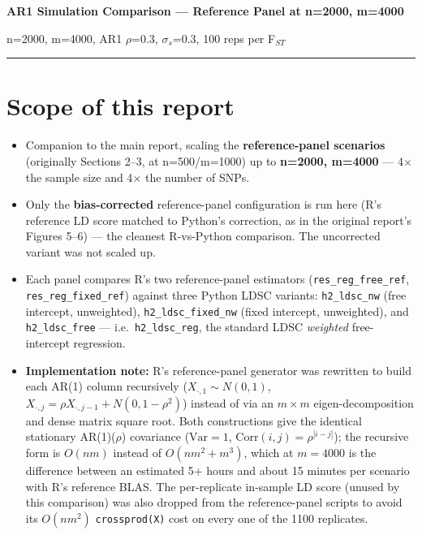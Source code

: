 \documentclass[10pt]{article}
\begin{document}
{\LARGE \bfseries AR1 Simulation Comparison --- Reference Panel at n=2000, m=4000}

\vspace{2pt}
{\color{inksoft} {\small\ttfamily n=2000, m=4000, AR1 $\rho$=0.3, $\sigma_s$=0.3, 100 reps per F$_{ST}$}}

\vspace{3pt}
\noindent\rule{\linewidth}{0.4pt}

\section*{Scope of this report}
\begin{itemize}[leftmargin=14pt, itemsep=1.5pt, topsep=1pt]
  \item Companion to the main report, scaling the \textbf{reference-panel scenarios} (originally Sections 2--3, at n=500/m=1000) up to \textbf{n=2000, m=4000} --- 4$\times$ the sample size and 4$\times$ the number of SNPs.
  \item Only the \textbf{bias-corrected} reference-panel configuration is run here (R's reference LD score matched to Python's correction, as in the original report's Figures 5--6) --- the cleanest R-vs-Python comparison. The uncorrected variant was not scaled up.
  \item Each panel compares R's two reference-panel estimators (\texttt{res\_reg\_free\_ref}, \texttt{res\_reg\_fixed\_ref}) against three Python LDSC variants: \texttt{h2\_ldsc\_nw} (free intercept, unweighted), \texttt{h2\_ldsc\_fixed\_nw} (fixed intercept, unweighted), and \texttt{h2\_ldsc\_free} --- i.e.\ \texttt{h2\_ldsc\_reg}, the standard LDSC \emph{weighted} free-intercept regression.
  \item \textbf{Implementation note:} R's reference-panel generator was rewritten to build each AR(1) column recursively ($X_{\cdot,1}\sim N(0,1)$, $X_{\cdot,j}=\rho X_{\cdot,j-1}+N(0,1-\rho^2)$) instead of via an $m\times m$ eigen-decomposition and dense matrix square root. Both constructions give the identical stationary AR(1)($\rho$) covariance ($\mathrm{Var}=1$, $\mathrm{Corr}(i,j)=\rho^{|i-j|}$); the recursive form is $O(nm)$ instead of $O(nm^2+m^3)$, which at $m=4000$ is the difference between an estimated 5+ hours and about 15 minutes per scenario with R's reference BLAS. The per-replicate in-sample LD score (unused by this comparison) was also dropped from the reference-panel scripts to avoid its $O(nm^2)$ \texttt{crossprod(X)} cost on every one of the 1100 replicates.
\end{itemize}
\end{document}
